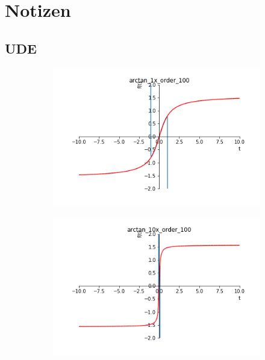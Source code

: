 \documentclass[arbeit=studie,oneside,BCOR=12mm]{ArbeitRST}
\begin{document}
%


\chapter{Notizen}

\section{UDE}

\begin{figure}[ht]
\begin{subfigure}[c]{0.5\textwidth}
\centering
\includegraphics[width=1\textwidth]{images/arctan_1x_order_100}

\end{subfigure}
\begin{subfigure}[c]{0.5\textwidth}
\centering
\includegraphics[width=1\textwidth]{images/arctan_10x_order_100}


\end{subfigure}
\end{figure}
\end{document}
